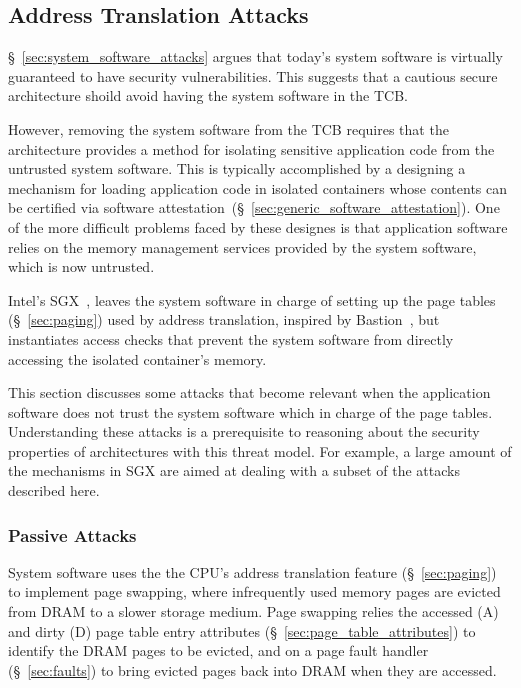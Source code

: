 \subsection{Address Translation Attacks}
\label{sec:address_translation_attacks}

\S~\ref{sec:system_software_attacks} argues that today's system software is
virtually guaranteed to have security vulnerabilities. This suggests that a
cautious secure architecture shoild avoid having the system software in the
TCB.

However, removing the system software from the TCB requires that the
architecture provides a method for isolating sensitive application code from
the untrusted system software. This is typically accomplished by a designing a
mechanism for loading application code in isolated containers whose contents
can be certified via software
attestation~(\S~\ref{sec:generic_software_attestation}). One of the more
difficult problems faced by these designes is that application software relies
on the memory management services provided by the system software, which is now
untrusted.

Intel's SGX~\cite{mckeen2013sgx, anati2013sgx}, leaves the system software in charge of
setting up the page tables (\S~\ref{sec:paging}) used by address translation, inspired by Bastion~\cite{champagne2010bastion},
but instantiates access checks that prevent the system software from directly
accessing the isolated container's memory.

This section discusses some attacks that become relevant when the application
software does not trust the system software which in charge of the page tables.
Understanding these attacks is a prerequisite to reasoning about the security
properties of architectures with this threat model. For example, a large amount
of the mechanisms in SGX are aimed at dealing with a subset of the attacks
described here.


\subsubsection{Passive Attacks}
\label{sec:fault_tracking_attacks}

System software uses the the CPU's address translation feature
(\S~\ref{sec:paging}) to implement page swapping, where infrequently used
memory pages are evicted from DRAM to a slower storage medium. Page swapping
relies the accessed (A) and dirty (D) page table entry attributes
(\S~\ref{sec:page_table_attributes}) to identify the DRAM pages to be evicted,
and on a page fault handler (\S~\ref{sec:faults}) to bring evicted pages back
into DRAM when they are accessed.

